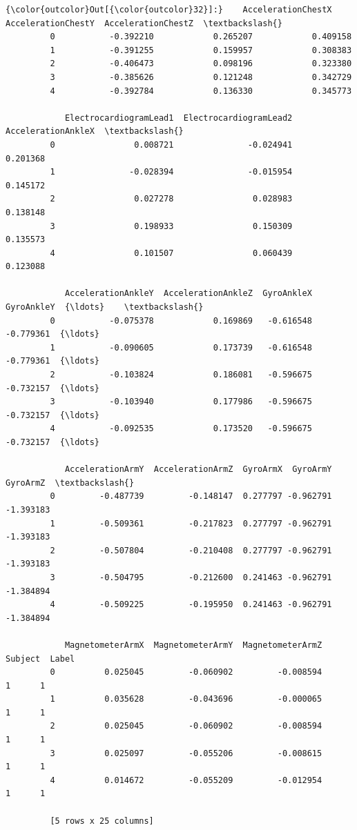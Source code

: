 \documentclass[11pt]{article}
\begin{document}
\begin{Verbatim}[commandchars=\\\{\}]
{\color{outcolor}Out[{\color{outcolor}32}]:}    AccelerationChestX  AccelerationChestY  AccelerationChestZ  \textbackslash{}
         0           -0.392210            0.265207            0.409158   
         1           -0.391255            0.159957            0.308383   
         2           -0.406473            0.098196            0.323380   
         3           -0.385626            0.121248            0.342729   
         4           -0.392784            0.136330            0.345773   
         
            ElectrocardiogramLead1  ElectrocardiogramLead2  AccelerationAnkleX  \textbackslash{}
         0                0.008721               -0.024941            0.201368   
         1               -0.028394               -0.015954            0.145172   
         2                0.027278                0.028983            0.138148   
         3                0.198933                0.150309            0.135573   
         4                0.101507                0.060439            0.123088   
         
            AccelerationAnkleY  AccelerationAnkleZ  GyroAnkleX  GyroAnkleY  {\ldots}    \textbackslash{}
         0           -0.075378            0.169869   -0.616548   -0.779361  {\ldots}     
         1           -0.090605            0.173739   -0.616548   -0.779361  {\ldots}     
         2           -0.103824            0.186081   -0.596675   -0.732157  {\ldots}     
         3           -0.103940            0.177986   -0.596675   -0.732157  {\ldots}     
         4           -0.092535            0.173520   -0.596675   -0.732157  {\ldots}     
         
            AccelerationArmY  AccelerationArmZ  GyroArmX  GyroArmY  GyroArmZ  \textbackslash{}
         0         -0.487739         -0.148147  0.277797 -0.962791 -1.393183   
         1         -0.509361         -0.217823  0.277797 -0.962791 -1.393183   
         2         -0.507804         -0.210408  0.277797 -0.962791 -1.393183   
         3         -0.504795         -0.212600  0.241463 -0.962791 -1.384894   
         4         -0.509225         -0.195950  0.241463 -0.962791 -1.384894   
         
            MagnetometerArmX  MagnetometerArmY  MagnetometerArmZ  Subject  Label  
         0          0.025045         -0.060902         -0.008594        1      1  
         1          0.035628         -0.043696         -0.000065        1      1  
         2          0.025045         -0.060902         -0.008594        1      1  
         3          0.025097         -0.055206         -0.008615        1      1  
         4          0.014672         -0.055209         -0.012954        1      1  
         
         [5 rows x 25 columns]
\end{Verbatim}
            
\end{document}

